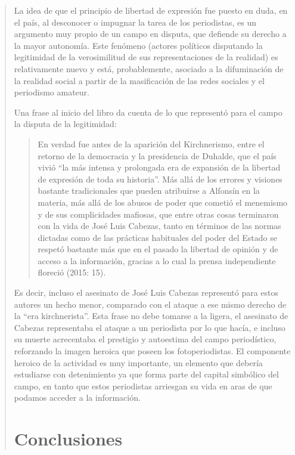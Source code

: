 \begin{quote}
La idea de que el principio de libertad de expresión fue puesto en duda, en el país, al desconocer o impugnar la tarea de los periodistas, es un argumento muy propio de un campo en disputa, que defiende su derecho a la mayor autonomía. Este fenómeno (actores políticos disputando la legitimidad de la verosimilitud de sus representaciones de la realidad) es relativamente nuevo y está, probablemente, asociado a la difuminación de la realidad social a partir de la masificación de las redes sociales y el periodismo amateur.

Una frase al inicio del libro da cuenta de lo que representó para el campo la disputa de la legitimidad:

\begin{quote}
	En verdad fue antes de la aparición del Kirchnerismo, entre el retorno de la democracia y la presidencia de Duhalde, que el país vivió \enquote{la más intensa y prolongada era de expansión de la libertad de expresión de toda su historia}. Más allá de los errores y visiones bastante tradicionales que pueden atribuirse a Alfonsín en la materia, más allá de los abusos de poder que cometió el menemismo y de sus complicidades mafiosas, que entre otras cosas terminaron con la vida de José Luis Cabezas, tanto en términos de las normas dictadas como de las prácticas habituales del poder del Estado se respetó bastante más que en el pasado la libertad de opinión y de acceso a la información, gracias a lo cual la prensa independiente floreció (2015: 15).
\end{quote}


Es decir, incluso el asesinato de José Luis Cabezas representó para estos autores un hecho menor, comparado con el ataque a ese mismo derecho de la \enquote{era kirchnerista}. Esta frase no debe tomarse a la ligera, el asesinato de Cabezas representaba el ataque a un periodista por lo que hacía, e incluso su muerte acrecentaba el prestigio y autoestima del campo periodístico, reforzando la imagen heroica que poseen los fotoperiodistas. El componente heroico de la actividad es muy importante, un elemento que debería estudiarse con detenimiento ya que forma parte del capital simbólico del campo, en tanto que estos periodistas arriesgan su vida en aras de que podamos acceder a la información.

\backmatter

\chapter {Conclusiones}


\end{quote}
